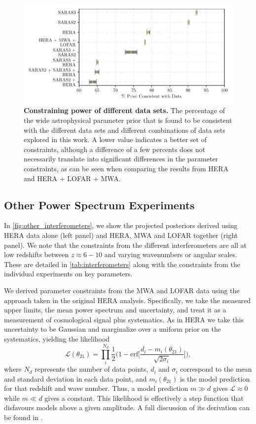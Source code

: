 \begin{figure}
    \centering
    \includegraphics{joint_constraints/figs/volume_contraction.pdf}
    \caption{\textbf{Constraining power of different data sets.} The percentage of the wide astrophysical parameter prior that is found to be consistent with the different data sets and different combinations of data sets explored in this work. A lower value indicates a better set of constraints, although a difference of a few percents does not necessarily translate into significant differences in the parameter constraints, as can be seen when comparing the results from HERA and HERA + LOFAR + MWA.}
    \label{fig:volume_contraction}
\end{figure}

\subsection{Other Power Spectrum Experiments}
\label{sec:other_interferometers}

In \cref{fig:other_interferometers}, we show the projected posteriors derived using HERA data alone (left panel) and HERA, MWA and LOFAR together (right panel). We note that the constraints from the different interferometers are all at low redshifts between $z\approx 6 - 10$ and varying wavenumbers or angular scales. These are detailed in \cref{tab:interferometers} along with the constraints from the individual experiments on key parameters.

We derived parameter constraints from the MWA and LOFAR data using the approach taken in the original HERA analysis. Specifically, we take the measured upper limits, the mean power spectrum and uncertainty, and treat it as a measurement of cosmological signal plus systematics. As in HERA \cite{HERA_2022b} we take this uncertainty to be Gaussian and marginalize over a uniform prior on the systematics, yielding the likelihood
\begin{equation}
    \mathcal{L}(\theta_{21}) = \prod_i^{N_d}\frac{1}{2}\bigg(1 - \mathrm{erf}\bigg[\frac{d_i - m_i(\theta_{21})}{\sqrt{2\sigma_i}}\bigg]\bigg), 
\end{equation}
where $N_d$ represents the number of data points, $d_i$ and $\sigma_i$ correspond to the mean and standard deviation in each data point, and $m_i(\theta_{21})$ is the model prediction for that redshift and wave number. Thus, a model prediction $m\gg d$ gives $\mathcal{L}\approx0$ while $m\ll d$ gives a constant. This likelihood is effectively a step function that disfavours models above a given amplitude. A full discussion of its derivation can be found in \cite{HERA_2022b}.

